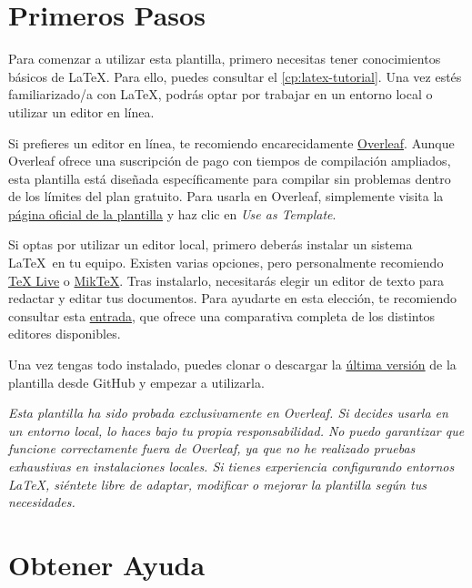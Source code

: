 {\section{Primeros Pasos}

Para comenzar a utilizar esta plantilla, primero necesitas tener conocimientos básicos de \LaTeX. Para ello, puedes consultar el \autoref{cp:latex-tutorial}. Una vez estés familiarizado/a con \LaTeX, podrás optar por trabajar en un entorno local o utilizar un editor en línea.

Si prefieres un editor en línea, te recomiendo encarecidamente \href{https://www.overleaf.com/}{Overleaf}. Aunque Overleaf ofrece una suscripción de pago con tiempos de compilación ampliados, esta plantilla está diseñada específicamente para compilar sin problemas dentro de los límites del plan gratuito. Para usarla en Overleaf, simplemente visita la \href{https://www.overleaf.com/latex/templates/unofficial-polytechnic-university-of-leiria-estg-thesis-slash-report-template/tqgbrncfhwgt}{página oficial de la plantilla} y haz clic en \textit{Use as Template}.

Si optas por utilizar un editor local, primero deberás instalar un sistema \LaTeX~en tu equipo. Existen varias opciones, pero personalmente recomiendo \href{https://www.tug.org/texlive/}{TeX Live} o \href{https://miktex.org/}{MikTeX}. Tras instalarlo, necesitarás elegir un editor de texto para redactar y editar tus documentos. Para ayudarte en esta elección, te recomiendo consultar esta \href{https://tex.stackexchange.com/questions/339/latex-editors-ides}{entrada}, que ofrece una comparativa completa de los distintos editores disponibles.

Una vez tengas todo instalado, puedes clonar o descargar la \href{https://github.com/joseareia/ipleiria-thesis/releases}{última versión} de la plantilla desde GitHub y empezar a utilizarla.

\begin{block}[warning]
\textit{Esta plantilla ha sido probada exclusivamente en Overleaf. Si decides usarla en un entorno local, lo haces bajo tu propia responsabilidad. No puedo garantizar que funcione correctamente fuera de Overleaf, ya que no he realizado pruebas exhaustivas en instalaciones locales. Si tienes experiencia configurando entornos \LaTeX, siéntete libre de adaptar, modificar o mejorar la plantilla según tus necesidades.}
\end{block}

\section{Obtener Ayuda}

}
